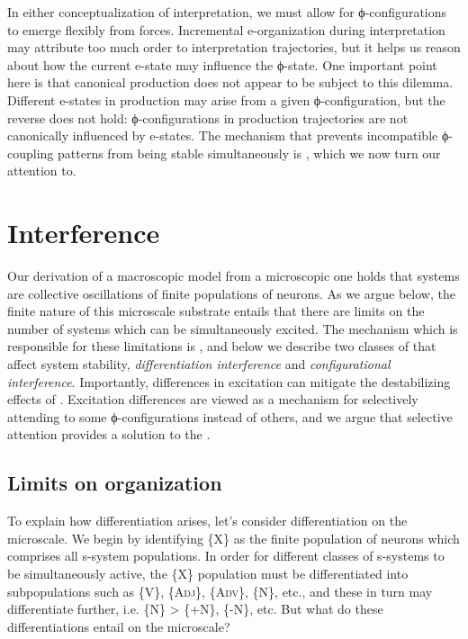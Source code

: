   In either conceptualization of interpretation, we must allow for ϕ-configurations to emerge flexibly from  forces. Incremental e-organization during interpretation may attribute too much order to interpretation trajectories, but it helps us reason about how the current e-state may influence the ϕ-state. One important point here is that canonical production does not appear to be subject to this dilemma. Different e-states in production may arise from a given ϕ-configuration, but the reverse does not hold: ϕ-configurations in production trajectories are not canonically influenced by e-states. The mechanism that prevents incompatible ϕ-coupling patterns from being stable simultaneously is , which we now turn our attention to.

\section{Interference}

Our derivation of a macroscopic model from a microscopic one holds that systems are collective oscillations of finite populations of neurons. As we argue below, the finite nature of this microscale substrate entails that there are limits on the number of  systems which can be simultaneously excited. The mechanism which is responsible for these limitations is , and below we describe two classes of  that affect system stability, \textit{differentiation interference} and \textit{configurational interference}. Importantly, differences in excitation can mitigate the destabilizing effects of . Excitation differences are viewed as a mechanism for selectively attending to some ϕ-configurations instead of others, and we argue that selective attention provides a solution to the .

\subsection{Limits on organization}

To explain how differentiation  arises, let's consider differentiation on the microscale. We begin by identifying \{X\} as the finite population of neurons which comprises all s-system populations. In order for different classes of s-systems to be simultaneously active, the \{X\} population must be differentiated into subpopulations such as \{V\}, \{A\textsc{dj}\}, \{A\textsc{dv}\}, \{N\}, etc., and these in turn may differentiate further, i.e. \{N\} > \{+N\}, \{-N\}, etc. But what do these differentiations entail on the microscale?

